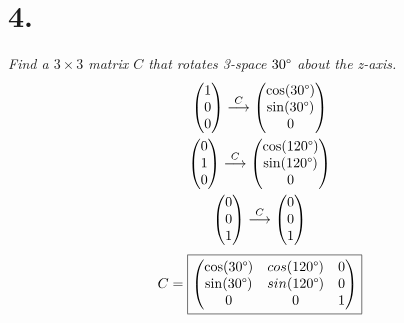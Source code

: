 \documentclass[12pt]{article}
\begin{document}
\section*{4.}
\textit{Find a $3 \times 3$ matrix $C$ that rotates 3-space $30 \degree$ about
the z-axis.}
\begin{gather*}
	\begin{pmatrix} 1 \\ 0 \\ 0 \end{pmatrix}
	\overset{C}{\longrightarrow}
	\begin{pmatrix} \cos(30 \degree) \\ \sin(30 \degree) \\ 0 \end{pmatrix}
	\\
	\begin{pmatrix} 0 \\ 1 \\ 0 \end{pmatrix}
	\overset{C}{\longrightarrow}
	\begin{pmatrix} \cos(120 \degree) \\ \sin(120 \degree) \\ 0 \end{pmatrix}
	\\
	\begin{pmatrix} 0 \\ 0 \\ 1 \end{pmatrix}
	\overset{C}{\longrightarrow}
	\begin{pmatrix} 0 \\ 0 \\ 1 \end{pmatrix}
\end{gather*}
\begin{equation*}
	C =
	\boxed{
		\begin{pmatrix}
			\cos(30 \degree) & cos(120 \degree) & 0 \\
			\sin(30 \degree) & sin(120 \degree) & 0 \\
			0 & 0 & 1
		\end{pmatrix}
	}
\end{equation*}
\end{document}
